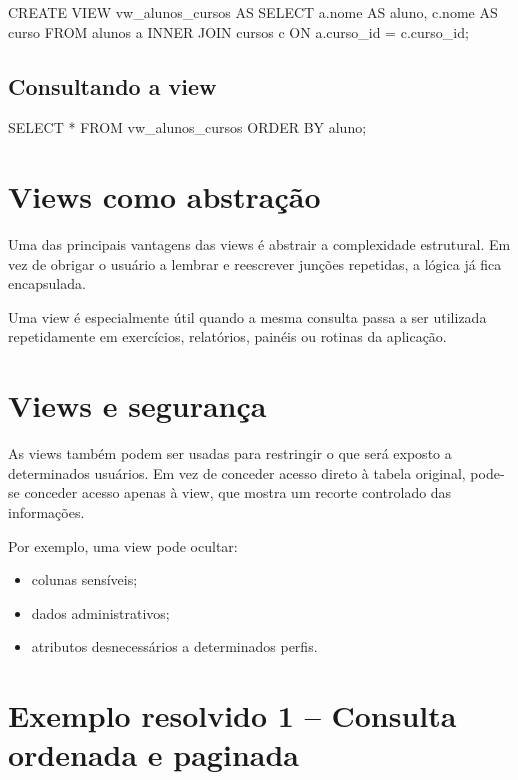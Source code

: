 \begin{sqlcode}
CREATE VIEW vw_alunos_cursos AS
SELECT
    a.nome AS aluno,
    c.nome AS curso
FROM alunos a
INNER JOIN cursos c
    ON a.curso_id = c.curso_id;
\end{sqlcode}

\subsection{Consultando a view}

\begin{sqlcode}
SELECT *
FROM vw_alunos_cursos
ORDER BY aluno;
\end{sqlcode}

\section{Views como abstração}

Uma das principais vantagens das views é abstrair a complexidade estrutural. Em vez de obrigar o usuário a lembrar e reescrever junções repetidas, a lógica já fica encapsulada.

\begin{observacao}
Uma view é especialmente útil quando a mesma consulta passa a ser utilizada repetidamente em exercícios, relatórios, painéis ou rotinas da aplicação.
\end{observacao}

\section{Views e segurança}

As views também podem ser usadas para restringir o que será exposto a determinados usuários. Em vez de conceder acesso direto à tabela original, pode-se conceder acesso apenas à view, que mostra um recorte controlado das informações.

Por exemplo, uma view pode ocultar:
\begin{itemize}
    \item colunas sensíveis;
    \item dados administrativos;
    \item atributos desnecessários a determinados perfis.
\end{itemize}

\section{Exemplo resolvido 1 -- Consulta ordenada e paginada}


